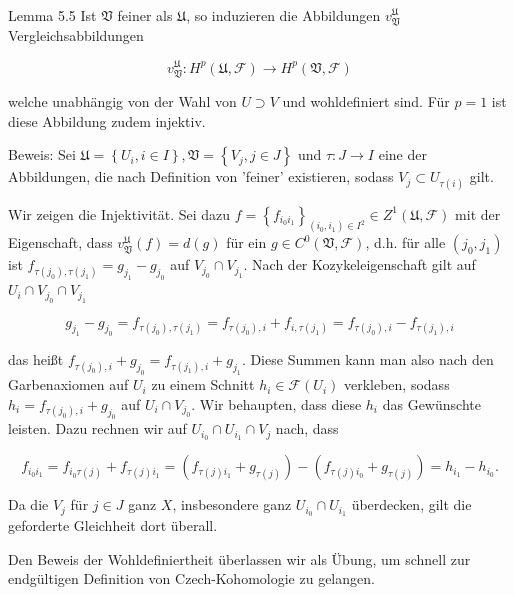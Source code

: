 \documentclass[10pt, letterpaper]{article}
\begin{document}
Lemma 5.5 Ist $\mathfrak{V}$ feiner als $\mathfrak{U}$, so induzieren die Abbildungen $v_{\mathfrak{V}}^{\mathfrak{U}}$ Vergleichsabbildungen

$$
v_{\mathfrak{V}}^{\mathfrak{U}}: H^{p}(\mathfrak{U}, \mathcal{F}) \rightarrow H^{p}(\mathfrak{V}, \mathcal{F})
$$

welche unabhängig von der Wahl von $U \supset V$ und wohldefiniert sind. Für $p=1$ ist diese Abbildung zudem injektiv.

Beweis: Sei $\mathfrak{U}=\left\{U_{i}, i \in I\right\}, \mathfrak{V}=\left\{V_{j}, j \in J\right\}$ und $\tau: J \rightarrow I$ eine der Abbildungen, die nach Definition von 'feiner' existieren, sodass $V_{j} \subset U_{\tau(i)}$ gilt.

Wir zeigen die Injektivität. Sei dazu $f=\left\{f_{i_{0} i_{1}}\right\}_{\left(i_{0}, i_{1}\right) \in I^{2}} \in Z^{1}(\mathfrak{U}, \mathcal{F})$ mit der Eigenschaft, dass $v_{\mathfrak{V}}^{\mathfrak{U}}(f)=d(g)$ für ein $g \in C^{0}(\mathfrak{V}, \mathcal{F})$, d.h. für alle $\left(j_{0}, j_{1}\right)$ ist $f_{\tau\left(j_{0}\right), \tau\left(j_{1}\right)}=g_{j_{1}}-g_{j_{0}}$ auf $V_{j_{0}} \cap V_{j_{1}}$. Nach der Kozykeleigenschaft gilt auf $U_{i} \cap V_{j_{0}} \cap V_{j_{1}}$

$$
g_{j_{1}}-g_{j_{0}}=f_{\tau\left(j_{0}\right), \tau\left(j_{1}\right)}=f_{\tau\left(j_{0}\right), i}+f_{i, \tau\left(j_{1}\right)}=f_{\tau\left(j_{0}\right), i}-f_{\tau\left(j_{1}\right), i}
$$

das heißt $f_{\tau\left(j_{0}\right), i}+g_{j_{0}}=f_{\tau\left(j_{1}\right), i}+g_{j_{1}}$. Diese Summen kann man also nach den Garbenaxiomen auf $U_{i}$ zu einem Schnitt $h_{i} \in \mathcal{F}\left(U_{i}\right)$ verkleben, sodass\\
$h_{i}=f_{\tau\left(j_{0}\right), i}+g_{j_{0}}$ auf $U_{i} \cap V_{j_{0}}$. Wir behaupten, dass diese $h_{i}$ das Gewünschte leisten. Dazu rechnen wir auf $U_{i_{0}} \cap U_{i_{1}} \cap V_{j}$ nach, dass

$$
f_{i_{0} i_{1}}=f_{i_{0} \tau(j)}+f_{\tau(j) i_{1}}=\left(f_{\tau(j) i_{1}}+g_{\tau(j)}\right)-\left(f_{\tau(j) i_{0}}+g_{\tau(j)}\right)=h_{i_{1}}-h_{i_{0}} .
$$

Da die $V_{j}$ für $j \in J$ ganz $X$, insbesondere ganz $U_{i_{0}} \cap U_{i_{1}}$ überdecken, gilt die geforderte Gleichheit dort überall.

Den Beweis der Wohldefiniertheit überlassen wir als Übung, um schnell zur endgültigen Definition von Czech-Kohomologie zu gelangen.
\end{document}
